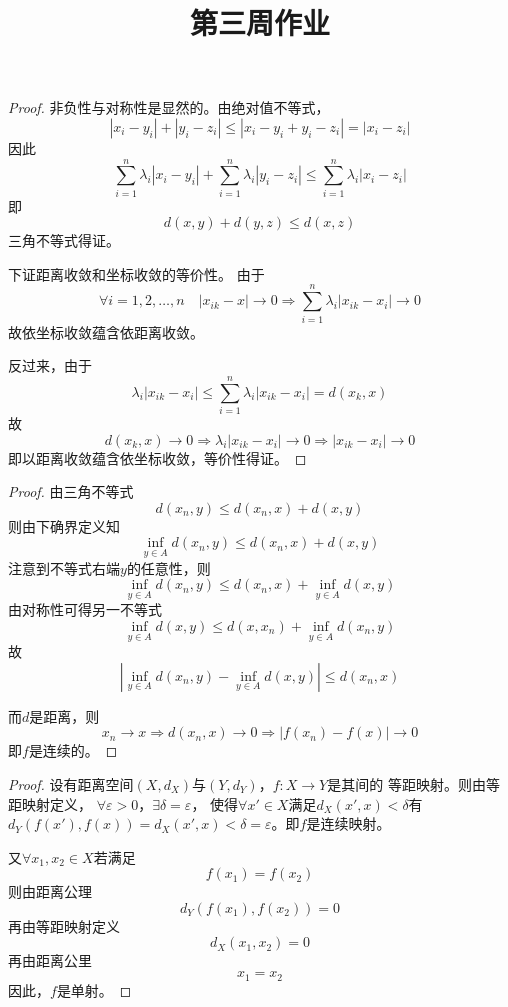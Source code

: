 \documentclass[cn]{homework}
\title{第三周作业}
\begin{document}
    \maketitle

    \problem
    \begin{proof}
        非负性与对称性是显然的。由绝对值不等式，
        \[|x_i-y_i|+|y_i-z_i|\leq|x_i-y_i+y_i-z_i|=|x_i-z_i|\]
        因此
        \[\sum_{i=1}^n\lambda_i|x_i-y_i|
        +\sum_{i=1}^n\lambda_i|y_i-z_i|
        \leq\sum_{i=1}^n\lambda_i|x_i-z_i|\]
        即
        \[d(x,y)+d(y,z)\leq d(x,z)\]
        三角不等式得证。

        下证距离收敛和坐标收敛的等价性。
        由于
        \[\forall i=1,2,\ldots,n\quad |x_{ik}-x|\to 0\Rightarrow
        \sum_{i=1}^n\lambda_i|x_{ik}-x_i|\to 0\]
        故依坐标收敛蕴含依距离收敛。

        反过来，由于
        \[\lambda_i|x_{ik}-x_i|\leq\sum_{i=1}^n\lambda_i|x_{ik}-x_i|
        =d(x_k,x)\]
        故
        \[d(x_k,x)\to 0\Rightarrow \lambda_i|x_{ik}-x_i|\to 0
        \Rightarrow |x_{ik}-x_i|\to 0\]
        即以距离收敛蕴含依坐标收敛，等价性得证。
    \end{proof}    
    
    \problem
    \begin{proof}
        \newcommand{\infy}{\inf_{y\in A}}
        \newcommand{\supy}{\sup_{y\in A}}
        由三角不等式
        \[d(x_n,y)\leq d(x_n,x)+d(x,y)\]
        则由下确界定义知
        \[\infy d(x_n,y)\leq d(x_n,x)+d(x,y)\]
        注意到不等式右端$y$的任意性，则
        \[\infy d(x_n,y)\leq d(x_n,x)+\infy d(x,y)\]
        由对称性可得另一不等式
        \[\infy d(x,y)\leq d(x,x_n)+\infy d(x_n,y)\]
        故
        \[\left|\infy d(x_n,y)-\infy d(x,y)\right|
        \leq d(x_n,x)\]

        而$d$是距离，则
        \[x_n\to x\Rightarrow d(x_n,x)\to 0
        \Rightarrow |f(x_n)-f(x)|\to 0\]
        即$f$是连续的。
    \end{proof}

    \problem
    \begin{proof}
        设有距离空间$(X,d_X)$与$(Y,d_Y)$，$f:X\to Y$是其间的
        等距映射。则由等距映射定义，
        $\forall\varepsilon>0$，$\exists\delta=\varepsilon$，
        使得$\forall x'\in X$满足$d_X(x',x)<\delta$有$d_Y(f(x'),f(x))
        =d_X(x',x)<\delta=\varepsilon$。即$f$是连续映射。

        又$\forall x_1,x_2\in X$若满足
        \[f(x_1)=f(x_2)\]
        则由距离公理
        \[d_Y(f(x_1),f(x_2))=0\]
        再由等距映射定义
        \[d_X(x_1,x_2)=0\]
        再由距离公里
        \[x_1=x_2\]
        因此，$f$是单射。
    \end{proof}
\end{document}
